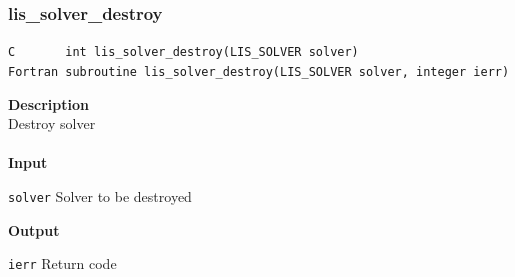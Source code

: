 \documentclass[a4paper]{article}
\newcommand{\namelistlabel}[1]{\mbox{#1}\hfill}
\newenvironment{namelist}[1]{%
 \begin{list}{}
  {\let\makelabel\namelistlabel
  \settowidth{\labelwidth}{#1}
  \setlength{\leftmargin}{1.1\labelwidth}}
}{%
\end{list}}
\begin{document}
  \subsubsection{lis\_solver\_destroy}
\begin{screen}
\verb|C       int lis_solver_destroy(LIS_SOLVER solver)|\\
\verb|Fortran subroutine lis_solver_destroy(LIS_SOLVER solver, integer ierr)|
\end{screen}
{\bf Description}\\
\indent
Destroy solver
\\ \\
\noindent
{\bf Input}
\begin{namelist}{XXXXXXXXXXXXXXXXXXXX}
\item[\tt solver] Solver to be destroyed
\end{namelist}
{\bf Output}
\begin{namelist}{XXXXXXXXXXXXXXXXXXXX}
\item[\tt ierr] Return code
\end{namelist}
\newpage
\end{document}

